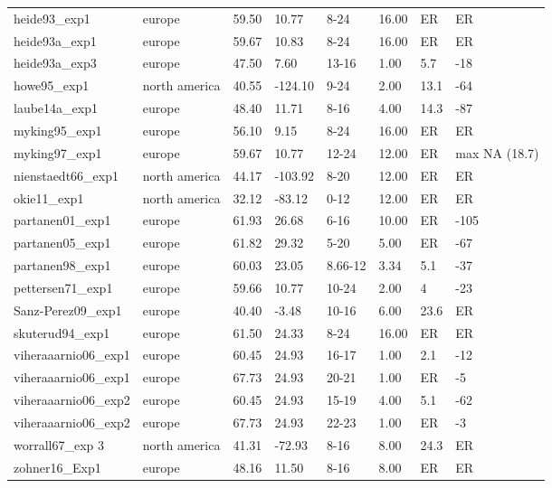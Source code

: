 \documentclass{article}
\begin{document}
\begin{table}[ht]
\begin{tabular}{|p{}|p{}|p{}|p{}|p{}|p{}|p{}|p{}|}
  heide93\_exp1 & europe & 59.50 & 10.77 & 8-24 & 16.00 & ER & ER \\ 
  heide93a\_exp1 & europe & 59.67 & 10.83 & 8-24 & 16.00 & ER & ER \\ 
  heide93a\_exp3 & europe & 47.50 & 7.60 & 13-16 & 1.00 & 5.7 & -18 \\ 
  howe95\_exp1 & north america & 40.55 & -124.10 & 9-24 & 2.00 & 13.1 & -64 \\ 
  laube14a\_exp1 & europe & 48.40 & 11.71 & 8-16 & 4.00 & 14.3 & -87 \\ 
  myking95\_exp1 & europe & 56.10 & 9.15 & 8-24 & 16.00 & ER & ER \\ 
  myking97\_exp1 & europe & 59.67 & 10.77 & 12-24 & 12.00 & ER & max NA (18.7) \\ 
  nienstaedt66\_exp1 & north america & 44.17 & -103.92 & 8-20 & 12.00 & ER & ER \\ 
  okie11\_exp1 & north america & 32.12 & -83.12 & 0-12 & 12.00 & ER & ER \\ 
  partanen01\_exp1 & europe & 61.93 & 26.68 & 6-16 & 10.00 & ER & -105 \\ 
  partanen05\_exp1 & europe & 61.82 & 29.32 & 5-20 & 5.00 & ER & -67 \\ 
  partanen98\_exp1 & europe & 60.03 & 23.05 & 8.66-12 & 3.34 & 5.1 & -37 \\ 
  pettersen71\_exp1 & europe & 59.66 & 10.77 & 10-24 & 2.00 & 4 & -23 \\ 
  Sanz-Perez09\_exp1 & europe & 40.40 & -3.48 & 10-16 & 6.00 & 23.6 & ER \\ 
  skuterud94\_exp1 & europe & 61.50 & 24.33 & 8-24 & 16.00 & ER & ER \\ 
  viheraaarnio06\_exp1 & europe & 60.45 & 24.93 & 16-17 & 1.00 & 2.1 & -12 \\ 
  viheraaarnio06\_exp1 & europe & 67.73 & 24.93 & 20-21 & 1.00 & ER & -5 \\ 
  viheraaarnio06\_exp2 & europe & 60.45 & 24.93 & 15-19 & 4.00 & 5.1 & -62 \\ 
  viheraaarnio06\_exp2 & europe & 67.73 & 24.93 & 22-23 & 1.00 & ER & -3 \\ 
  worrall67\_exp 3 & north america & 41.31 & -72.93 & 8-16 & 8.00 & 24.3 & ER \\ 
  zohner16\_Exp1 & europe & 48.16 & 11.50 & 8-16 & 8.00 & ER & ER \\ 
   \hline
\end{tabular}
\end{table}\clearpage
\end{document}
